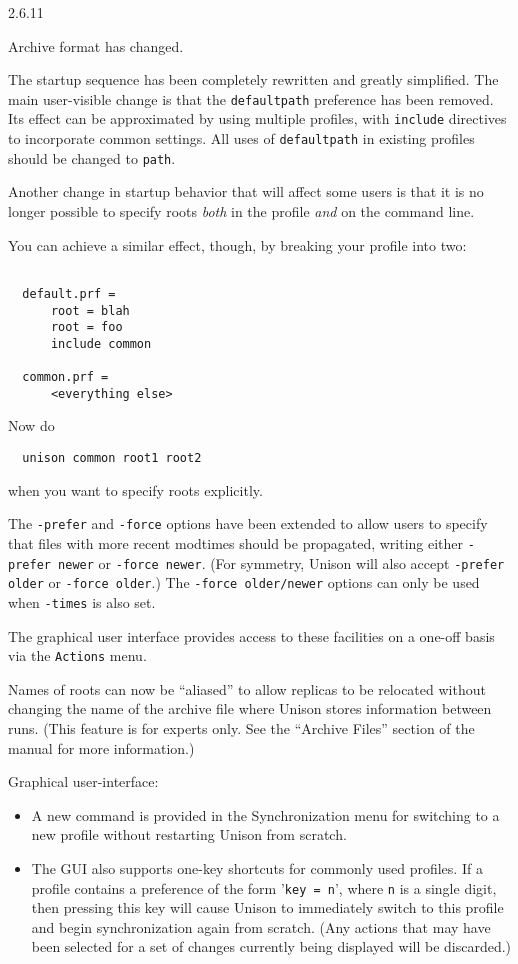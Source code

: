 \begin{changesfromversion}{2.6.11}
\item \incompatible{} Archive format has changed.  

\item \incompatible{} The startup sequence has been completely rewritten
and greatly simplified.  The main user-visible change is that the
\verb|defaultpath| preference has been removed.  Its effect can be
approximated by using multiple profiles, with \verb|include| directives
to incorporate common settings.  All uses of \verb|defaultpath| in
existing profiles should be changed to \verb|path|.

Another change in startup behavior that will affect some users is that it
is no longer possible to specify roots {\em both} in the profile {\em
  and} on the command line.

You can achieve a similar effect, though, by breaking your profile into
two:
\begin{verbatim}
  
  default.prf = 
      root = blah
      root = foo
      include common

  common.prf = 
      <everything else>
\end{verbatim}
Now do
\begin{verbatim}
  unison common root1 root2
\end{verbatim}
when you want to specify roots explicitly.

\item The \verb|-prefer| and \verb|-force| options have been extended to
allow users to specify that files with more recent modtimes should be
propagated, writing either \verb|-prefer newer| or \verb|-force newer|.
(For symmetry, Unison will also accept \verb|-prefer older| or
\verb|-force older|.)  The \verb|-force older/newer| options can only be
used when \verb|-times| is also set.

The graphical user interface provides access to these facilities on a
one-off basis via the \verb|Actions| menu.

\item Names of roots can now be ``aliased'' to allow replicas to be
relocated without changing the name of the archive file where Unison
stores information between runs.  (This feature is for experts only.  See
the ``Archive Files'' section of the manual for more information.)

\item Graphical user-interface:
\begin{itemize}
\item A new command is provided in the Synchronization menu for
  switching to a new profile without restarting Unison from scratch.
\item The GUI also supports one-key shortcuts for commonly
used profiles.  If a profile contains a preference of the form 
%
'\verb|key = n|', where \verb|n| is a single digit, then pressing this
key will cause Unison to immediately switch to this profile and begin
synchronization again from scratch.  (Any actions that may have been
selected for a set of changes currently being displayed will be
discarded.) 


\end{itemize}
\end{changesfromversion}
